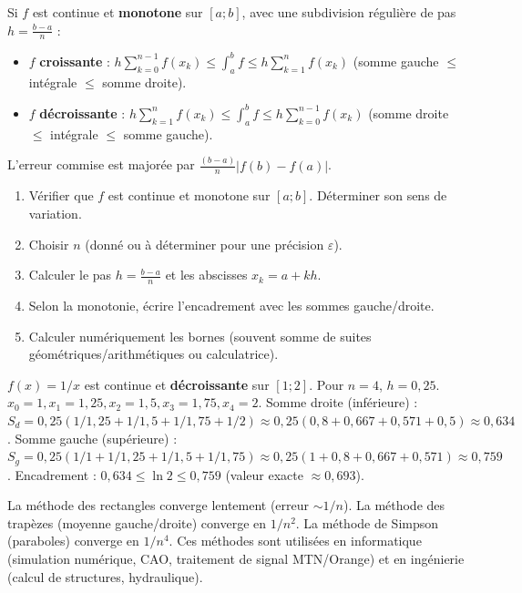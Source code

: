 \documentclass[11pt]{article}
\newcommand{\cle}[1]{{\popxbold\color{popdark}#1}}
\begin{document}
\begin{propriete}
Si $f$ est continue et \textbf{monotone} sur $[a;b]$, avec une subdivision régulière de pas $h=\frac{b-a}{n}$ :
\begin{itemize}
  \item $f$ \textbf{croissante} : $\displaystyle h\sum_{k=0}^{n-1} f(x_k) \le \int_a^b f \le h\sum_{k=1}^{n} f(x_k)$ (somme gauche $\le$ intégrale $\le$ somme droite).
  \item $f$ \textbf{décroissante} : $\displaystyle h\sum_{k=1}^{n} f(x_k) \le \int_a^b f \le h\sum_{k=0}^{n-1} f(x_k)$ (somme droite $\le$ intégrale $\le$ somme gauche).
\end{itemize}
L'erreur commise est majorée par $\frac{(b-a)}{n}|f(b)-f(a)|$.
\end{propriete}

\begin{methode}
\begin{enumerate}
  \item Vérifier que $f$ est continue et monotone sur $[a;b]$. Déterminer son sens de variation.
  \item Choisir $n$ (donné ou à déterminer pour une précision $\varepsilon$).
  \item Calculer le pas $h=\frac{b-a}{n}$ et les abscisses $x_k=a+kh$.
  \item Selon la monotonie, écrire l'encadrement avec les sommes gauche/droite.
  \item Calculer numériquement les bornes (souvent somme de suites géométriques/arithmétiques ou calculatrice).
\end{enumerate}
\end{methode}

\begin{exemplebox}[Encadrement de $\ln 2 = \int_1^2 \frac{\mathrm{d}x}{x}$]
$f(x)=1/x$ est continue et \textbf{décroissante} sur $[1;2]$.
Pour $n=4$, $h=0,25$. $x_0=1, x_1=1,25, x_2=1,5, x_3=1,75, x_4=2$.
Somme droite (inférieure) : $S_d = 0,25(1/1,25 + 1/1,5 + 1/1,75 + 1/2) \approx 0,25(0,8+0,667+0,571+0,5) \approx 0,634$.
Somme gauche (supérieure) : $S_g = 0,25(1/1 + 1/1,25 + 1/1,5 + 1/1,75) \approx 0,25(1+0,8+0,667+0,571) \approx 0,759$.
Encadrement : $\boxed{0,634 \le \ln 2 \le 0,759}$ (valeur exacte $\approx 0,693$).
\end{exemplebox}

\begin{savaistu}
La méthode des rectangles converge lentement (erreur $\sim 1/n$). La \cle{méthode des trapèzes} (moyenne gauche/droite) converge en $1/n^2$. La \cle{méthode de Simpson} (paraboles) converge en $1/n^4$. Ces méthodes sont utilisées en informatique (simulation numérique, CAO, traitement de signal MTN/Orange) et en ingénierie (calcul de structures, hydraulique).
\end{savaistu}
\end{document}
